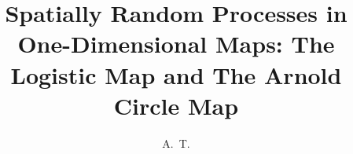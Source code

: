 \documentclass[defaultstyle,11pt]{thesis}
\title{Spatially Random Processes in One-Dimensional Maps: The
  Logistic Map and The Arnold Circle Map}
\author{A.~T.}{Le}
\begin{document}





\nocite{*}		%

\appendix

%
\end{document}
